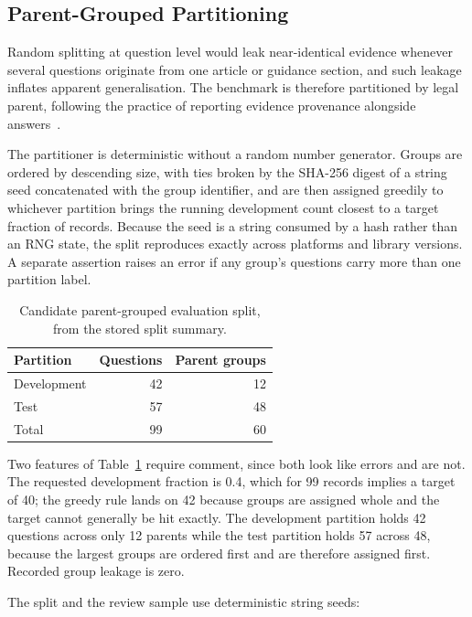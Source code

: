 \subsection{Parent-Grouped Partitioning}

Random splitting at question level would leak near-identical evidence whenever several questions originate from one article or guidance section, and such leakage inflates apparent generalisation. The benchmark is therefore partitioned by legal parent, following the practice of reporting evidence provenance alongside answers~\cite{petroni2021kilt}.

The partitioner is deterministic without a random number generator. Groups are ordered by descending size, with ties broken by the SHA-256 digest of a string seed concatenated with the group identifier, and are then assigned greedily to whichever partition brings the running development count closest to a target fraction of records. Because the seed is a string consumed by a hash rather than an RNG state, the split reproduces exactly across platforms and library versions. A separate assertion raises an error if any group's questions carry more than one partition label.

\begin{table}[htbp]
  \centering
  \caption{Candidate parent-grouped evaluation split, from the stored split summary.}
  \label{tab:split}
  \begin{tabular}{lrr}
    \toprule
    \textbf{Partition} & \textbf{Questions} & \textbf{Parent groups} \\
    \midrule
    Development & 42 & 12 \\
    Test & 57 & 48 \\
    \midrule
    Total & 99 & 60 \\
    \bottomrule
  \end{tabular}
\end{table}

Two features of Table~\ref{tab:split} require comment, since both look like errors and are not. The requested development fraction is 0.4, which for 99 records implies a target of 40; the greedy rule lands on 42 because groups are assigned whole and the target cannot generally be hit exactly. The development partition holds 42 questions across only 12 parents while the test partition holds 57 across 48, because the largest groups are ordered first and are therefore assigned first. Recorded group leakage is zero.

The split and the review sample use deterministic string seeds:

